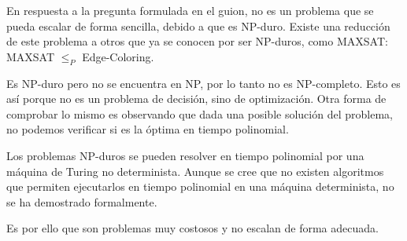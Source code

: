 \documentclass[12pt]{article} %
\begin{document}
En respuesta a la pregunta formulada en el guion, no es un problema que se pueda escalar de forma sencilla, debido a que es NP-duro. Existe una reducción de este problema a otros que ya se conocen por ser NP-duros, como MAXSAT: MAXSAT $\leq_P$ Edge-Coloring.

Es NP-duro pero no se encuentra en NP, por lo tanto no es NP-completo. Esto es así porque no es un problema de decisión, sino de optimización. Otra forma de comprobar lo mismo es observando que dada una posible solución del problema, no podemos verificar si es la óptima en tiempo polinomial.

Los problemas NP-duros se pueden resolver en tiempo polinomial por una máquina de Turing no determinista. Aunque se cree que no existen algoritmos que permiten ejecutarlos en tiempo polinomial en una máquina determinista, no se ha demostrado formalmente.

Es por ello que son problemas muy costosos y no escalan de forma adecuada.
\end{document}
